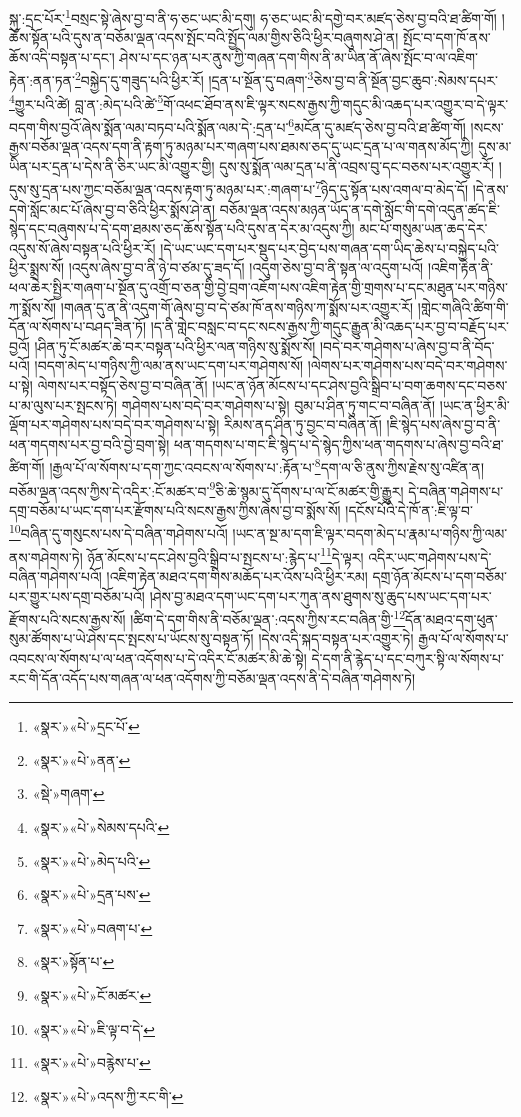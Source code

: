 སྐུ་:དྲང་པོར་\footnote{«སྣར་»«པེ་»དྲང་པོ་}བསྲང་སྟེ་ཞེས་བྱ་བ་ནི་ཧ་ཅང་ཡང་མི་དགུ། ཧ་ཅང་ཡང་མི་དགྱེ་བར་མཛད་ཅེས་བྱ་བའི་ཐ་ཚིག་གོ། །ཆོས་སྟོན་པའི་དུས་ན་བཅོམ་ལྡན་འདས་སྤོང་བའི་སྤྱོད་ལམ་གྱིས་ཅིའི་ཕྱིར་བཞུགས་ཤེ་ན། སྤོང་བ་དག་ཁོ་ནས་ཆོས་འདི་བསྟན་པ་དང་། ཤེས་པ་དང་ཉན་པར་ནུས་ཀྱི་གཞན་དག་གིས་ནི་མ་ཡིན་ནོ་ཞེས་སྤོང་བ་ལ་འཇིག་རྟེན་:ནན་ཏན་\footnote{«སྣར་»«པེ་»ནན་}བསྐྱེད་དུ་གཟུད་པའི་ཕྱིར་རོ། །དྲན་པ་སྔོན་དུ་བཞག་\footnote{«སྡེ་»གཞག་}ཅེས་བྱ་བ་ནི་སྔོན་བྱང་ཆུབ་:སེམས་དཔར་\footnote{«སྣར་»«པེ་»སེམས་དཔའི་}གྱུར་པའི་ཚེ། བླ་ན་:མེད་པའི་ཚེ་\footnote{«སྣར་»«པེ་»མེད་པའི་}གོ་འཕང་ཐོབ་ནས་ཇི་ལྟར་སངས་རྒྱས་ཀྱི་གདུང་མི་འཆད་པར་འགྱུར་བ་དེ་ལྟར་བདག་གིས་བྱའོ་ཞེས་སྨོན་ལམ་བཏབ་པའི་སྨོན་ལམ་དེ་:དྲན་པ་\footnote{«སྣར་»«པེ་»དྲན་པས་}མངོན་དུ་མཛད་ཅེས་བྱ་བའི་ཐ་ཚིག་གོ། །སངས་རྒྱས་བཅོམ་ལྡན་འདས་དག་ནི་རྟག་ཏུ་མཉམ་པར་གཞག་པས་ཐམས་ཅད་དུ་ཡང་དྲན་པ་ལ་གནས་མོད་ཀྱི། དུས་མ་ཡིན་པར་དྲན་པ་དེས་ནི་ཅིར་ཡང་མི་འགྱུར་གྱི། དུས་སུ་སྨོན་ལམ་དྲན་པ་ནི་འབྲས་བུ་དང་བཅས་པར་འགྱུར་རོ། །དུས་སུ་དྲན་པས་ཀྱང་བཅོམ་ལྡན་འདས་རྟག་ཏུ་མཉམ་པར་:གཞག་པ་\footnote{«སྣར་»«པེ་»བཞག་པ་}ཉིད་དུ་སྟོན་པས་འགལ་བ་མེད་དོ། །དེ་ནས་དགེ་སློང་མང་པོ་ཞེས་བྱ་བ་ཅིའི་ཕྱིར་སྨོས་ཤེ་ན། བཅོམ་ལྡན་འདས་མཉན་ཡོད་ན་དགེ་སློང་གི་དགེ་འདུན་ཚད་ཇི་སྙེད་དང་བཞུགས་པ་དེ་དག་ཐམས་ཅད་ཆོས་སྟོན་པའི་དུས་ན་དེར་མ་འདུས་ཀྱི། མང་པོ་གསུམ་ཡན་ཆད་དེར་འདུས་སོ་ཞེས་བསྟན་པའི་ཕྱིར་རོ། །དེ་ཡང་ཡང་དག་པར་སྡུད་པར་བྱེད་པས་གཞན་དག་ཡིད་ཆེས་པ་བསྐྱེད་པའི་ཕྱིར་སྨྲས་སོ། །འདུས་ཞེས་བྱ་བ་ནི་ཉེ་བ་ཙམ་དུ་ཟད་དོ། །འདུག་ཅེས་བྱ་བ་ནི་སྟན་ལ་འདུག་པའོ། །འཇིག་རྟེན་ནི་ཕལ་ཆེར་སྤྱིར་གཞག་པ་སྔོན་དུ་འགྲོ་བ་ཅན་གྱི་བྱེ་བྲག་འཇོག་པས་འཇིག་རྟེན་གྱི་གྲགས་པ་དང་མཐུན་པར་གཉིས་ཀ་སྨོས་སོ། །གཞན་དུ་ན་ནི་འདུག་གོ་ཞེས་བྱ་བ་དེ་ཙམ་ཁོ་ནས་གཉིས་ཀ་སྨོས་པར་འགྱུར་རོ། །གླེང་གཞིའི་ཚིག་གི་དོན་ལ་སོགས་པ་བཤད་ཟིན་ཏོ། །ད་ནི་གླེང་བསླང་བ་དང་སངས་རྒྱས་ཀྱི་གདུང་རྒྱུན་མི་འཆད་པར་བྱ་བ་བརྗོད་པར་བྱའོ། །ཤིན་ཏུ་ངོ་མཚར་ཆེ་བར་བསྟན་པའི་ཕྱིར་ལན་གཉིས་སུ་སྨོས་སོ། །བདེ་བར་གཤེགས་པ་ཞེས་བྱ་བ་ནི་བོད་པའོ། །བདག་མེད་པ་གཉིས་ཀྱི་ལམ་ནས་ཡང་དག་པར་གཤེགས་སོ། །ལེགས་པར་གཤེགས་པས་བདེ་བར་གཤེགས་པ་སྟེ། ལེགས་པར་བསྟོད་ཅེས་བྱ་བ་བཞིན་ནོ། །ཡང་ན་ཉོན་མོངས་པ་དང་ཤེས་བྱའི་སྒྲིབ་པ་བག་ཆགས་དང་བཅས་པ་མ་ལུས་པར་སྤངས་ཏེ། གཤེགས་པས་བདེ་བར་གཤེགས་པ་སྟེ། བུམ་པ་ཤིན་ཏུ་གང་བ་བཞིན་ནོ། །ཡང་ན་ཕྱིར་མི་ལྡོག་པར་གཤེགས་པས་བདེ་བར་གཤེགས་པ་སྟེ། རིམས་ནད་ཤིན་ཏུ་བྱང་བ་བཞིན་ནོ། །ཇི་སྙེད་པས་ཞེས་བྱ་བ་ནི་ཕན་གདགས་པར་བྱ་བའི་བྱེ་བྲག་སྟེ། ཕན་གདགས་པ་གང་ཇི་སྙེད་པ་དེ་སྙེད་ཀྱིས་ཕན་གདགས་པ་ཞེས་བྱ་བའི་ཐ་ཚིག་གོ། །རྒྱལ་པོ་ལ་སོགས་པ་དག་ཀྱང་འབངས་ལ་སོགས་པ་:རྟོན་པ་\footnote{«སྣར་»སྟོན་པ་}དག་ལ་ཅི་ནུས་ཀྱིས་རྗེས་སུ་འཛིན་ན། བཅོམ་ལྡན་འདས་ཀྱིས་དེ་འདིར་:ངོ་མཚར་བ་\footnote{«སྣར་»«པེ་»ངོ་མཚར་}ཅི་ཆེ་སྙམ་དུ་དོགས་པ་ལ་ངོ་མཚར་གྱི་རྒྱུར། དེ་བཞིན་གཤེགས་པ་དགྲ་བཅོམ་པ་ཡང་དག་པར་རྫོགས་པའི་སངས་རྒྱས་ཀྱིས་ཞེས་བྱ་བ་སྨོས་སོ། །དངོས་པོའི་དེ་ཁོ་ན་:ཇི་ལྟ་བ་\footnote{«སྣར་»«པེ་»ཇི་ལྟ་བ་དེ་}བཞིན་དུ་གསུངས་པས་དེ་བཞིན་གཤེགས་པའོ། །ཡང་ན་སྔ་མ་དག་ཇི་ལྟར་བདག་མེད་པ་རྣམ་པ་གཉིས་ཀྱི་ལམ་ནས་གཤེགས་ཏེ། ཉོན་མོངས་པ་དང་ཤེས་བྱའི་སྒྲིབ་པ་སྤངས་པ་:རྙེད་པ་\footnote{«སྣར་»«པེ་»བརྙེས་པ་}དེ་ལྟར། འདིར་ཡང་གཤེགས་པས་དེ་བཞིན་གཤེགས་པའོ། །འཇིག་རྟེན་མཐའ་དག་གིས་མཆོད་པར་འོས་པའི་ཕྱིར་རམ། དགྲ་ཉོན་མོངས་པ་དག་བཅོམ་པར་གྱུར་པས་དགྲ་བཅོམ་པའོ། །ཤེས་བྱ་མཐའ་དག་ཡང་དག་པར་ཀུན་ནས་ཐུགས་སུ་ཆུད་པས་ཡང་དག་པར་རྫོགས་པའི་སངས་རྒྱས་སོ། །ཚིག་དེ་དག་གིས་ནི་བཅོམ་ལྡན་:འདས་ཀྱིས་རང་བཞིན་གྱི་\footnote{«སྣར་»«པེ་»འདས་ཀྱི་རང་གི་}དོན་མཐའ་དག་ཕུན་སུམ་ཚོགས་པ་ཡེ་ཤེས་དང་སྤངས་པ་ཡོངས་སུ་བསྟན་ཏོ། །དེས་འདི་སྐད་བསྟན་པར་འགྱུར་ཏེ། རྒྱལ་པོ་ལ་སོགས་པ་འབངས་ལ་སོགས་པ་ལ་ཕན་འདོགས་པ་དེ་འདིར་ངོ་མཚར་མི་ཆེ་སྟེ། དེ་དག་ནི་རྙེད་པ་དང་བཀུར་སྟི་ལ་སོགས་པ་རང་གི་དོན་འདོད་པས་གཞན་ལ་ཕན་འདོགས་ཀྱི་བཅོམ་ལྡན་འདས་ནི་དེ་བཞིན་གཤེགས་ཏེ། 
